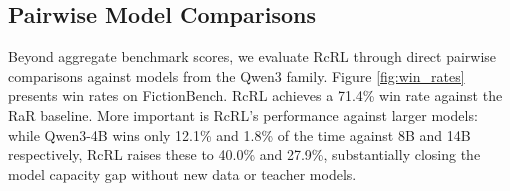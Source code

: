 \documentclass{article}
\theoremstyle{plain}
\theoremstyle{definition}
\theoremstyle{remark}
\begin{document}
\begin{table}[t]
  \caption{\textbf{Creative Writing Bench v3 evaluation results.} Three frontier models (GPT-5.2, Claude 4.5 Opus, Deepseek V3.2) serve as independent judges, evaluating outputs from each method via pairwise comparisons. We report ELO ratings (baseline anchored at 1000), rubric scores (0--100 scale), and win rates against the Qwen 3 4B baseline (\%). ELO ratings reflect relative rankings within each judge and are not comparable across judges. Best results per metric and judge in \textbf{bold}.}
  \begin{center}
    \begin{small}
      \begin{sc}
      \end{sc}
    \end{small}
  \end{center}
\label{tab:main-results}

\end{table}

\subsection{Pairwise Model Comparisons}
Beyond aggregate benchmark scores, we evaluate RcRL through direct pairwise comparisons against models from the Qwen3 family. Figure \ref{fig:win_rates} presents win rates on FictionBench. RcRL achieves a 71.4\% win rate against the RaR baseline. More important is RcRL’s performance against larger models: while Qwen3-4B wins only 12.1\% and 1.8\% of the time against 8B and 14B respectively, RcRL raises these to 40.0\% and 27.9\%, substantially closing the model capacity gap without new data or teacher models.
\end{document}
